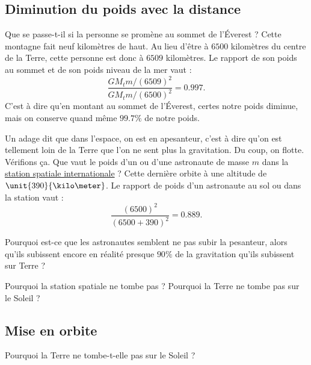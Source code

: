 \subsection{Diminution du poids avec la distance}

Que se passe-t-il si la personne se promène au sommet de l'Éverest ? Cette montagne fait neuf kilomètres de haut. Au lieu d'être à $6500$ kilomètres du centre de la Terre, cette personne est donc à $6509$ kilomètres. Le rapport de son poids au sommet et de son poids niveau de la mer vaut :
\[ 
  \frac{ GM_tm/(6509)^2 }{ GM_tm/(6500)^2 }=0.997.
\]
C'est à dire qu'en montant au sommet de l'Éverest, certes notre poids diminue, mais on conserve quand même $99.7\%$ de notre poids.

Un adage dit que dans l'espace, on est en apesanteur, c'est à dire qu'on est tellement loin de la Terre que l'on ne sent plus la gravitation. Du coup, on flotte. Vérifions ça. Que vaut le poids d'un ou d'une astronaute de masse $m$ dans la \href{http://fr.wikipedia.org/wiki/Station_spatiale_internationale}{station spatiale internationale} ? Cette dernière orbite à une altitude de $\unit{390}{\kilo\meter}$. Le rapport de poids d'un astronaute au sol ou dans la station vaut :
\[ 
  \frac{ (6500)^2 }{ (6500+390)^2 }=0.889.
\]

\begin{probleme}
	Pourquoi est-ce que les astronautes semblent ne pas subir la pesanteur, alors qu'ils subissent encore en réalité presque $90\%$ de la gravitation qu'ils subissent sur Terre ?

	Pourquoi la station spatiale ne tombe pas ? Pourquoi la Terre ne tombe pas sur le Soleil ?
\end{probleme}




\subsection{Mise en orbite}
\label{SubSecMiseEnOrbite}
Pourquoi la Terre ne tombe-t-elle pas sur le Soleil ? 

